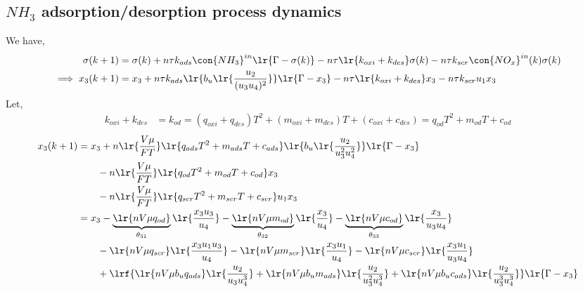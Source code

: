 \subsection{$NH_3$ adsorption/desorption process dynamics}
We have,
\begin{align*}
        \sigma(k + 1) &= \sigma(k)
        + n\tau k_{ads} \con{NH_3}^{in} \lr{\Gamma - \sigma(k)}
        - n \tau \lr{k_{oxi} + k_{des}} \sigma(k)
        - n \tau k_{scr} \con{NO_x}^{in}(k) \sigma(k) \\
        \implies x_3(k+1) &= x_3
                + n\tau k_{ads} \lr{b_u \lr{\frac{u_2}{(u_3 u_4)^2}}} \lr{\Gamma - x_3}
                - n \tau \lr{k_{oxi} + k_{des}} x_3
                - n \tau k_{scr} u_1 x_3
\end{align*}
Let,
\begin{align*}
        k_{oxi} + k_{des} &= k_{od} = (q_{oxi} + q_{des})T^2 + (m_{oxi} + m_{des}) T + (c_{oxi} + c_{des}) = q_{od} T^2 + m_{od} T + c_{od}
\end{align*}
\begin{align*}
        x_3(k+1) &= x_3
                + n \lr{\frac{V \mu}{FT}} \lr{q_{ads} T^2 + m_{ads} T + c_{ads}} \lr{b_u \lr{\frac{u_2}{u_3^2 u_4^2}}} \lr{\Gamma - x_3} \\
                & \qquad - n \lr{\frac{V \mu}{FT}} \lr{q_{od} T^2 + m_{od} T + c_{od}} x_3 \\
                & \qquad - n \lr{\frac{V \mu}{FT}} \lr{q_{scr} T^2 + m_{scr} T + c_{scr}} u_1 x_3\\
                &= x_3 - \underbrace{\lr{n V \mu q_{od}}}_{\theta_{31}} \lr{\frac{x_3 u_3}{u_4}}
                             - \underbrace{\lr{n V \mu m_{od}}}_{\theta_{32}} \lr{\frac{x_3}{u_4}}
                             - \underbrace{\lr{n V \mu c_{od}}}_{\theta_{33}} \lr{\frac{x_3}{u_3 u_4}} \\
                & \qquad - \lr{n V \mu q_{scr}} \lr{\frac{x_3 u_1 u_3}{u_4}}
                             - \lr{n V \mu m_{scr}} \lr{\frac{x_3 u_1}{u_4}}
                             - \lr{n V \mu c_{scr}} \lr{\frac{x_3 u_1}{u_3 u_4}} \\
                & \qquad +\lrf{ \lr{n V \mu b_u q_{ads}} \lr{\frac{u_2}{u_3 u_4^3}}
                                          + \lr{n V \mu b_u m_{ads}} \lr{\frac{u_2}{u_3^2 u_4^3}}
                                          + \lr{n V \mu b_u c_{ads}} \lr{\frac{u_2}{u_3^3 u_4^3}} } \lr{\Gamma - x_3}
\end{align*}
